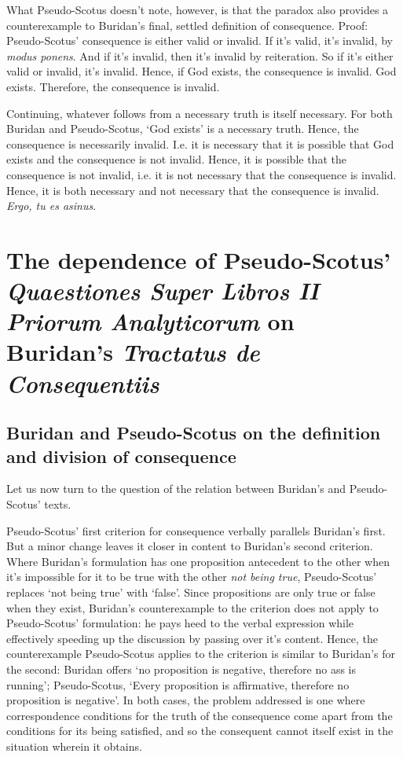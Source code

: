 	What Pseudo-Scotus doesn't note, however, is that the paradox also provides a counterexample to Buridan's final, settled definition of consequence. Proof: Pseudo-Scotus' consequence is either valid or invalid. If it's valid, it's invalid, by \textit{modus ponens}. And if it's invalid, then it's invalid by reiteration. So if it's either valid or invalid, it's invalid. Hence, if God exists, the consequence is invalid. God exists. Therefore, the consequence is invalid.
	
	Continuing, whatever follows from a necessary truth is itself necessary. For both Buridan and Pseudo-Scotus, `God exists' is a necessary truth. Hence, the consequence is necessarily invalid. I.e. it is necessary that it is possible that God exists and the consequence is not invalid. Hence, it is possible that the consequence is not invalid, i.e. it is not necessary that the consequence is invalid. Hence, it is both necessary and not necessary that the consequence is invalid. \textit{Ergo, tu es asinus}.
	
	\section[Dependence of Pseudo-Scotus on Buridan]{The dependence of Pseudo-Scotus' \textit{Quaestiones Super Libros II Priorum Analyticorum} on Buridan's \textit{Tractatus de Consequentiis}}
	\subsection{Buridan and Pseudo-Scotus on the definition and division of consequence}
	Let us now turn to the question of the relation between Buridan's and Pseudo-Scotus' texts.
	
	Pseudo-Scotus' first criterion for consequence verbally parallels Buridan's first. But a minor change leaves it closer in content to Buridan's second criterion. Where Buridan's formulation has one proposition antecedent to the other when it's impossible for it to be true with the other \textit{not being true}, Pseudo-Scotus' replaces `not being true' with `false'. Since propositions are only true or false when they exist, Buridan's counterexample to the criterion does not apply to Pseudo-Scotus' formulation: he pays heed to the verbal expression while effectively speeding up the discussion by passing over it's content. Hence, the counterexample Pseudo-Scotus applies to the criterion is similar to Buridan's for the second: Buridan offers `no proposition is negative, therefore no ass is running'; Pseudo-Scotus, `Every proposition is affirmative, therefore no proposition is negative'. In both cases, the problem addressed is one where correspondence conditions for the truth of the consequence come apart from the conditions for its being satisfied, and so the consequent cannot itself exist in the situation wherein it obtains. 
	
